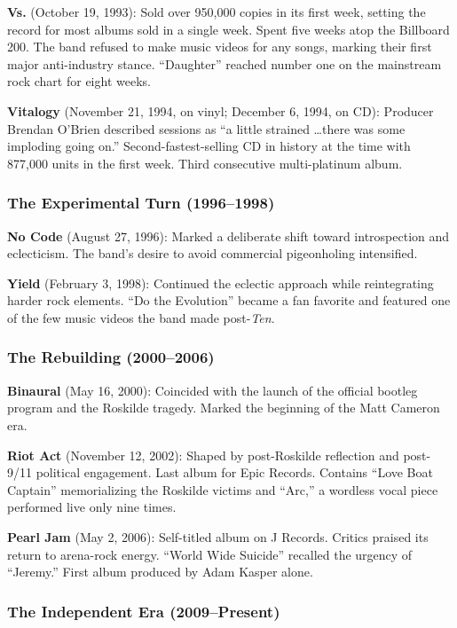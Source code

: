 \documentclass[11pt,letterpaper]{article}
\begin{document}
\textbf{Vs.} (October 19, 1993): Sold over 950,000 copies in its first week, setting the record for most albums sold in a single week. Spent five weeks atop the Billboard 200. The band refused to make music videos for any songs, marking their first major anti-industry stance. ``Daughter'' reached number one on the mainstream rock chart for eight weeks.

\textbf{Vitalogy} (November 21, 1994, on vinyl; December 6, 1994, on CD): Producer Brendan O'Brien described sessions as ``a little strained \ldots there was some imploding going on.'' Second-fastest-selling CD in history at the time with 877,000 units in the first week. Third consecutive multi-platinum album.

\subsubsection{The Experimental Turn (1996--1998)}

\textbf{No Code} (August 27, 1996): Marked a deliberate shift toward introspection and eclecticism. The band's desire to avoid commercial pigeonholing intensified.

\textbf{Yield} (February 3, 1998): Continued the eclectic approach while reintegrating harder rock elements. ``Do the Evolution'' became a fan favorite and featured one of the few music videos the band made post-\textit{Ten}.

\subsubsection{The Rebuilding (2000--2006)}

\textbf{Binaural} (May 16, 2000): Coincided with the launch of the official bootleg program and the Roskilde tragedy. Marked the beginning of the Matt Cameron era.

\textbf{Riot Act} (November 12, 2002): Shaped by post-Roskilde reflection and post-9/11 political engagement. Last album for Epic Records. Contains ``Love Boat Captain'' memorializing the Roskilde victims and ``Arc,'' a wordless vocal piece performed live only nine times.

\textbf{Pearl Jam} (May 2, 2006): Self-titled album on J Records. Critics praised its return to arena-rock energy. ``World Wide Suicide'' recalled the urgency of ``Jeremy.'' First album produced by Adam Kasper alone.

\subsubsection{The Independent Era (2009--Present)}
\end{document}
